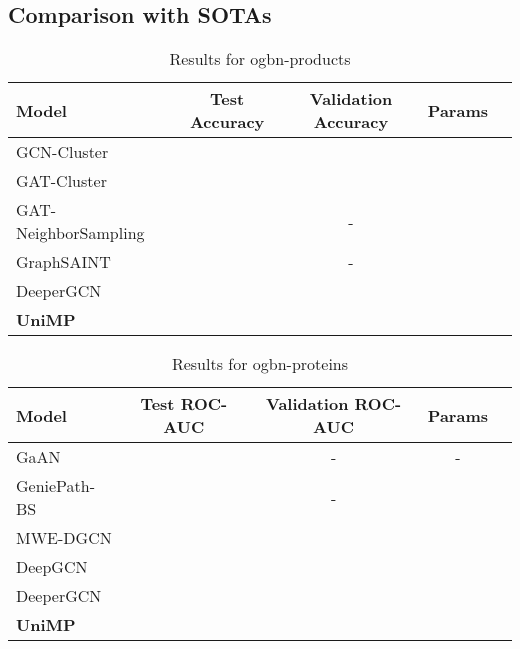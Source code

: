 \documentclass{article} \usepackage{iclr2021_conference,times}
\begin{document}
\subsection{Comparison with SOTAs}


\begin{table}[htbp]
	\setlength{\abovecaptionskip}{0.cm}
	\setlength{\belowcaptionskip}{-.2cm}
	\caption{Results for ogbn-products}
    \small
	\begin{center}
		\begin{tabular}{l|cccc}
			{\bf Model}  & {\bf Test Accuracy	} &  {\bf Validation Accuracy	}  &  {\bf Params} \\
			\hline 
			GCN-Cluster \citep{chiang2019cluster} &  &  &  \\
			GAT-Cluster & & & \\ 
			GAT-NeighborSampling &  & - &\\
			GraphSAINT \citep{zeng2019graphsaint} &  & - & \\
			DeeperGCN  \citep{li2020deepergcn} &  &  &   \\
			\hline 
			{\bf UniMP} & & &\\
		\end{tabular}
	\end{center}
	\label{table:ret_products}
\end{table}

\begin{table}[h]
	\setlength{\abovecaptionskip}{0.cm}
	\setlength{\belowcaptionskip}{-.2cm}
	\caption{Results for ogbn-proteins}
	\small
	\begin{center}
		\begin{tabular}{l|cccc}
			{\bf Model}  & {\bf Test ROC-AUC	} &  {\bf Validation ROC-AUC	}  &  {\bf Params} \\
			\hline 
			GaAN \citep{zhang2018gaan} &  & - & - \\
			GeniePath-BS \citep{liu2020bandit} & & - & \\ 
			MWE-DGCN&  & &\\
			DeepGCN \citep{li2019deepgcns}&  &  & \\
			DeeperGCN \citep{li2020deepergcn}  &  &  &   \\
			\hline 
			{\bf UniMP} & & &\\
		\end{tabular}
	\end{center}
	\label{table:ret_proteins}
\end{table}
\end{document}
